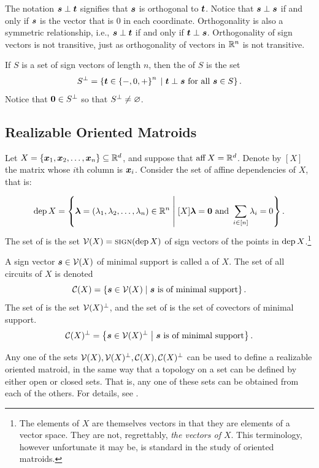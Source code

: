         The notation \(\bm{s}\perp\bm{t}\) signifies that \(\bm{s}\) is orthogonal to \(\bm{t}\).  Notice that \(\bm{s}\perp\bm{s}\) if and only if \(\bm{s}\) is the vector that is \(0\) in each coordinate.  Orthogonality is also a symmetric relationship, i.{}e.{}, \(\bm{s}\perp\bm{t}\) if and only if \(\bm{t}\perp\bm{s}\).  Orthogonality of sign vectors is not transitive, just as orthogonality of vectors in \(\mathbb{R}^{n}\) is not transitive.

        If \(S\) is a set of sign vectors of length \(n\), then the  of \(S\) is the set
            \[
                S^\perp
                    =   \setb{\ve t\in\seta{-,0,+}^n}{\ve t\perp\ve s\text{ for all }\ve s\in S}.
            \]
        Notice that \(\bm{0}\in S^\perp\) so that \(S^\perp\ne\varnothing\).

    \subsection{Realizable Oriented Matroids}\label{SSec:Realizable}
        Let \(X=\left\{\bm{x}_1,\bm{x}_2,\dotsc, \bm{x}_n\right\}\subseteq\mathbb{R}^{d}\), and suppose that \(\operatorname{aff} X=\mathbb{R}^{d}\).  Denote by \([X]\) the matrix whose \(i\)th column is \(\bm{x}_i\).  Consider the set of affine dependencies of \(X\), that is:

        \[
            \dep X
                =   \setb{\ve\la=(\la_1,\la_2\dc\la_n)\in\R n}{[X]\ve\la=\ve0\text{ and }\sum_{i\in\brac n}\la_i=0}.
        \]
        The set of  is the set \(\mathcal{V}(X)=\operatorname{{\textsc{sign}}}(\operatorname{dep} X)\) of sign vectors of the points in \(\operatorname{dep} X\).\footnote{The elements of \(X\) are themselves vectors in that they are elements of a vector space.  They are not, regrettably, \emph{the vectors of \(X\)}.  This terminology, however unfortunate it may be, is standard in the study of oriented matroids.}

        A sign vector \(\bm{s}\in\mathcal{V}(X)\) of minimal support is called a  of \(X\).  The set of all circuits of \(X\) is denoted
            \[
                \mc C(X)
                    =   \setb{\ve s\in\mc V(X)}{\ve s\text{ is of minimal support}}.
            \]
        The set of  is the set \(\mathcal{V}(X)^\perp\), and the set of  is the set of covectors of minimal support.
            \[
                \mc C(X)^\perp
                    =   \setb{\ve s\in\mc V(X)^\perp}{\ve s\text{ is of minimal support}}.
            \]

        Any one of the sets \(\mathcal{V}(X), \mathcal{V}(X)^\perp,\mathcal{C}(X),\mathcal{C}(X)^\perp\) can be used to define a realizable oriented matroid, in the same way that a topology on a set can be defined by either open or closed sets.  That is, any one of these sets can be obtained from each of the others.  For details, see \cite[section 6.3]{ZieglerBook}.
